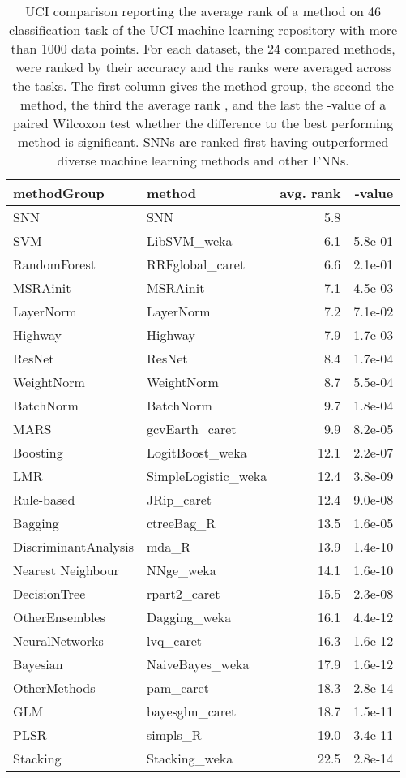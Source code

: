 \documentclass{article}
\begin{document}
\begin{table}[ht]
\caption[Method comparison on large UCI data sets]{UCI comparison reporting the average rank
of a method on 46 classification task of the 
UCI machine learning repository with more than 1000 data points. 
For each dataset, the 24 compared methods, 
were ranked by their
accuracy and the ranks were averaged across the tasks. 
The first column gives the method group, the second the 
method, the third  
the average rank , and the last the -value 
of a paired Wilcoxon test whether the difference to the best performing 
method is significant.
SNNs are ranked first having outperformed diverse machine learning methods and
other FNNs.  \label{tab:uciS2}}

\centering
\begin{tabular}{llrr}
  \toprule
 methodGroup & method & avg. rank & -value \\ 
  \midrule
  SNN & SNN &  5.8 & \\ 
  SVM & LibSVM\_weka &  6.1 & 5.8e-01 \\ 
  RandomForest & RRFglobal\_caret &  6.6 & 2.1e-01 \\ 
  MSRAinit & MSRAinit &  7.1 & 4.5e-03 \\ 
  LayerNorm & LayerNorm &  7.2 & 7.1e-02 \\ 
  Highway & Highway &  7.9 & 1.7e-03 \\ 
  ResNet & ResNet &  8.4 & 1.7e-04 \\ 
  WeightNorm & WeightNorm &  8.7 & 5.5e-04 \\ 
  BatchNorm & BatchNorm &  9.7 & 1.8e-04 \\ 
  MARS & gcvEarth\_caret &  9.9 & 8.2e-05 \\ 
  Boosting & LogitBoost\_weka & 12.1 & 2.2e-07 \\ 
  LMR & SimpleLogistic\_weka & 12.4 & 3.8e-09 \\ 
  Rule-based & JRip\_caret & 12.4 & 9.0e-08 \\ 
  Bagging & ctreeBag\_R & 13.5 & 1.6e-05 \\ 
  DiscriminantAnalysis & mda\_R & 13.9 & 1.4e-10 \\ 
  Nearest Neighbour & NNge\_weka & 14.1 & 1.6e-10 \\ 
  DecisionTree & rpart2\_caret & 15.5 & 2.3e-08 \\ 
  OtherEnsembles & Dagging\_weka & 16.1 & 4.4e-12 \\ 
  NeuralNetworks & lvq\_caret & 16.3 & 1.6e-12 \\ 
  Bayesian & NaiveBayes\_weka & 17.9 & 1.6e-12 \\ 
  OtherMethods & pam\_caret & 18.3 & 2.8e-14 \\ 
  GLM & bayesglm\_caret & 18.7 & 1.5e-11 \\ 
  PLSR & simpls\_R & 19.0 & 3.4e-11 \\ 
  Stacking & Stacking\_weka & 22.5 & 2.8e-14 \\ 
   \bottomrule
\end{tabular}
\end{table}
\end{document}
